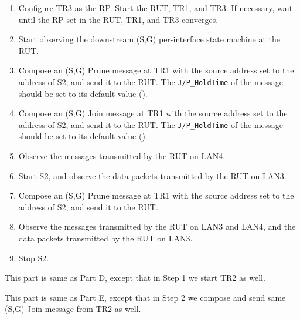 \documentclass[11pt]{report}
\begin{document}
\begin{enumerate}

  \item Configure TR3 as the RP. Start the RUT, TR1, and TR3. If
  necessary, wait until the RP-set in the RUT, TR1, and TR3
  converges.

  \item Start observing the downstream (S,G) per-interface state
  machine at the RUT.

  \item Compose an (S,G) Prune message at TR1 with the source address set
  to the address of S2, and send it to the RUT.
  The \verb=J/P_HoldTime= of the message should be set to its default
  value ({\PimsmJPHoldTime}).

  \item Compose an (S,G) Join message at TR1 with the source address set
  to the address of S2, and send it to the RUT.
  The \verb=J/P_HoldTime= of the message should be set to its default
  value ({\PimsmJPHoldTime}).

  \item Observe the messages transmitted by the RUT on LAN4.

  \item Start S2, and observe the data packets transmitted by the RUT on
  LAN3.

  \item Compose an (S,G) Prune message at TR1 with the source address set
  to the address of S2, and send it to the RUT.

  \item Observe the messages transmitted by the RUT on LAN3 and LAN4,
  and the data packets transmitted by the RUT on LAN3.

  \item Stop S2.

\end{enumerate}


This part is same as Part D, except that in Step 1 we start TR2 as well.


This part is same as Part E, except that in Step 2 we compose and send
same (S,G) Join message from TR2 as well.


\end{document}
